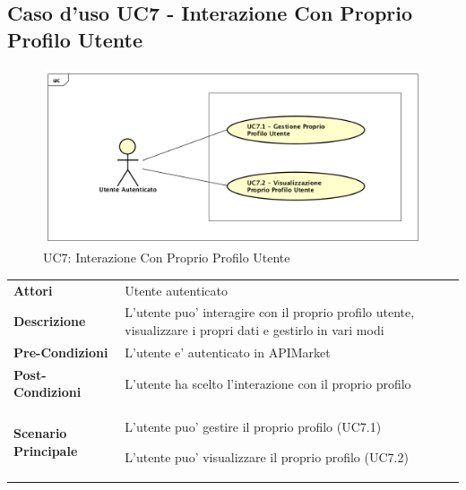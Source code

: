 \newpage
\subsection{Caso d'uso UC7 - Interazione Con Proprio Profilo Utente}
\label{UC7}
\begin{figure}[ht]
	\centering
	\includegraphics[scale=0.45]{UML/UC7.png}
	\caption{UC7: Interazione Con Proprio Profilo Utente}
\end{figure}

\begin{longtable}{ l | p{11cm}}
	\hline
	\rowcolor{Gray}
	\multicolumn{2}{c}{UC7 - Interazione Con Proprio Profilo Utente}\\
	\hline
	
	 \textbf{Attori} & Utente autenticato  \\
	\textbf{Descrizione} & L'utente puo' interagire con il proprio profilo utente, visualizzare i propri dati e gestirlo in vari modi  \\
	\textbf{Pre-Condizioni} & L'utente e' autenticato in APIMarket\\
	\textbf{Post-Condizioni} & L'utente ha scelto l'interazione con il proprio profilo\\
	\textbf{Scenario Principale} & 
	\begin{enumerate*}[label=(\arabic*.),itemjoin={\newline}]
		\item L'utente puo' gestire il proprio profilo (UC7.1)
		\item L'utente puo' visualizzare il proprio profilo (UC7.2)
	\end{enumerate*}\\
\end{longtable}
